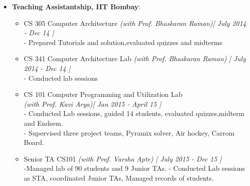 \begin{itemize}
	\item \textbf{Teaching Assistantship, IIT Bombay}: \hfill \\[-0.6cm]
	\begin{itemize}
		\item CS 305 Computer Architecture  \hfill \emph{(with Prof. Bhaskaran Raman)}\hfill {\emph{[ July 2014 - Dec 14 ]}} \\[0.05cm]
- Prepared Tutorials and solution,evaluated quizzes and midterms \\[-0.5cm]
		\item CS 341 Computer Architecture Lab \hfill \emph{(with Prof. Bhaskaran Raman)} \hfill {\emph{[ July 2014 - Dec 14 ]}}\\[0.05cm]
- Conducted lab sessions \\[-0.5cm]
		\item CS 101 Computer Programming and Utilization Lab \\
		\hfill \emph{(with Prof. Kavi Arya)}\hfill {\emph{[ Jan 2015 - April 15 ]}} \\[0.05cm]
- Conducted Lab sessions, guided 14 students, evaluated quizzes,midterm and Endsem.\\
- Supervised three project teams, Pyramix solver, Air hockey, Carrom Board.\\[-0.5cm]
  \item Senior TA CS101 \hfill \emph{(with Prof.  Varsha Apte)} \hfill {\emph{[ July 2015 - Dec 15 ]}}\\[0.05cm]
-Managed lab of 90 students and 9 Junior TAs.
- Conducted Lab sessions as STA, coordinated Junior TAs, Managed records of students.   
	\end{itemize}
\end{itemize}
